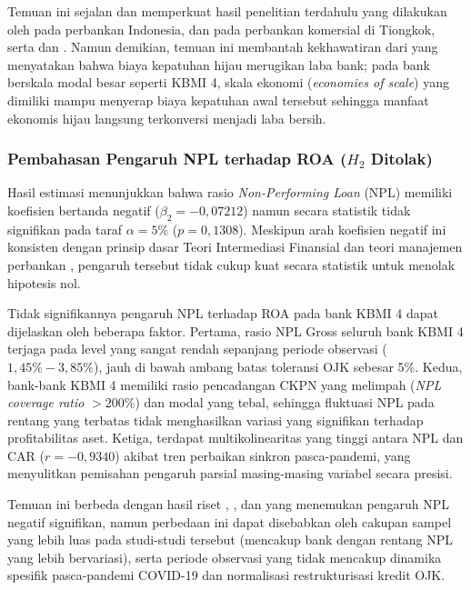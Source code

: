 \documentclass[12pt,a4paper]{article}
\numberwithin{equation}{section}
\begin{document}
\noindent
Temuan ini sejalan dan memperkuat hasil penelitian terdahulu yang dilakukan oleh \citet{Pramono2022} pada perbankan Indonesia, \citet{Yin2021} dan \citet{Sun2021} pada perbankan komersial di Tiongkok, serta \citet{SariAstuti2023} dan \citet{WulandariRahardjo2022}. Namun demikian, temuan ini membantah kekhawatiran dari \citet{Akomea2022} yang menyatakan bahwa biaya kepatuhan hijau merugikan laba bank; pada bank berskala modal besar seperti KBMI 4, skala ekonomi (\emph{economies of scale}) yang dimiliki mampu menyerap biaya kepatuhan awal tersebut sehingga manfaat ekonomis hijau langsung terkonversi menjadi laba bersih.

\subsubsection{Pembahasan Pengaruh NPL terhadap ROA \texorpdfstring{($H_2$ Ditolak)}{(H2 Ditolak)}}
\noindent
Hasil estimasi menunjukkan bahwa rasio \emph{Non-Performing Loan} (NPL) memiliki koefisien bertanda negatif ($\beta_2 = -0{,}07212$) namun secara statistik tidak signifikan pada taraf $\alpha = 5\%$ ($p = 0{,}1308$). Meskipun arah koefisien negatif ini konsisten dengan prinsip dasar Teori Intermediasi Finansial \citep{GurleyShaw1960, Diamond1984} dan teori manajemen perbankan \citep{KuncoroSuhardjono2018}, pengaruh tersebut tidak cukup kuat secara statistik untuk menolak hipotesis nol.

\noindent
Tidak signifikannya pengaruh NPL terhadap ROA pada bank KBMI 4 dapat dijelaskan oleh beberapa faktor. Pertama, rasio NPL Gross seluruh bank KBMI 4 terjaga pada level yang sangat rendah sepanjang periode observasi ($1{,}45\% - 3{,}85\%$), jauh di bawah ambang batas toleransi OJK sebesar 5\%. Kedua, bank-bank KBMI 4 memiliki rasio pencadangan CKPN yang melimpah (\emph{NPL coverage ratio} $> 200\%$) dan modal yang tebal, sehingga fluktuasi NPL pada rentang yang terbatas tidak menghasilkan variasi yang signifikan terhadap profitabilitas aset. Ketiga, terdapat multikolinearitas yang tinggi antara NPL dan CAR ($r = -0{,}9340$) akibat tren perbaikan sinkron pasca-pandemi, yang menyulitkan pemisahan pengaruh parsial masing-masing variabel secara presisi.

\noindent
Temuan ini berbeda dengan hasil riset \citet{PraditaSyaichu2022}, \citet{HandayaniSubowo2022}, dan \citet{HaryantoSudarno2023} yang menemukan pengaruh NPL negatif signifikan, namun perbedaan ini dapat disebabkan oleh cakupan sampel yang lebih luas pada studi-studi tersebut (mencakup bank dengan rentang NPL yang lebih bervariasi), serta periode observasi yang tidak mencakup dinamika spesifik pasca-pandemi COVID-19 dan normalisasi restrukturisasi kredit OJK.
\end{document}
